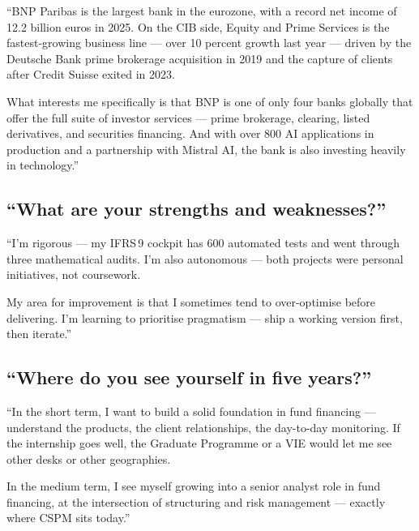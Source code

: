 \documentclass[11pt,a4paper]{article}
\begin{document}
\begin{verbatimbox}
``BNP Paribas is the largest bank in the eurozone, with a record net income
of 12.2 billion euros in 2025. On the CIB side, Equity and Prime Services
is the fastest-growing business line --- over 10 percent growth last year ---
driven by the Deutsche Bank prime brokerage acquisition in 2019 and the
capture of clients after Credit Suisse exited in 2023.

What interests me specifically is that BNP is one of only four banks
globally that offer the full suite of investor services --- prime brokerage,
clearing, listed derivatives, and securities financing. And with over
800 AI applications in production and a partnership with Mistral AI,
the bank is also investing heavily in technology.''
\end{verbatimbox}

\subsection{``What are your strengths and weaknesses?''}

\begin{verbatimbox}
``I'm rigorous --- my IFRS\,9 cockpit has 600 automated tests and went
through three mathematical audits. I'm also autonomous --- both projects
were personal initiatives, not coursework.

My area for improvement is that I sometimes tend to over-optimise before
delivering. I'm learning to prioritise pragmatism --- ship a working
version first, then iterate.''
\end{verbatimbox}

\subsection{``Where do you see yourself in five years?''}

\begin{verbatimbox}
``In the short term, I want to build a solid foundation in fund financing
--- understand the products, the client relationships, the day-to-day
monitoring. If the internship goes well, the Graduate Programme or a VIE
would let me see other desks or other geographies.

In the medium term, I see myself growing into a senior analyst role in
fund financing, at the intersection of structuring and risk management ---
exactly where CSPM sits today.''
\end{verbatimbox}
\end{document}
